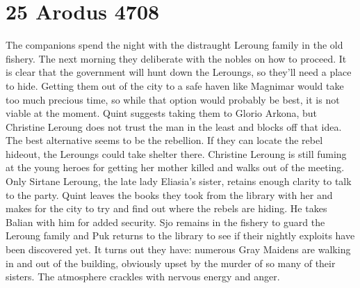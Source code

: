 \section{25 Arodus 4708}

The companions spend the night with the distraught Leroung family in the old fishery. The next morning they deliberate with the nobles on how to proceed. It is clear that the government will hunt down the Leroungs, so they'll need a place to hide. Getting them out of the city to a safe haven like Magnimar would take too much precious time, so while that option would probably be best, it is not viable at the moment. Quint suggests taking them to Glorio Arkona, but Christine Leroung does not trust the man in the least and blocks off that idea. The best alternative seems to be the rebellion. If they can locate the rebel hideout, the Leroungs could take shelter there. Christine Leroung is still fuming at the young heroes for getting her mother killed and walks out of the meeting. Only Sirtane Leroung, the late lady Eliasia's sister, retains enough clarity to talk to the party. Quint leaves the books they took from the library with her and makes for the city to try and find out where the rebels are hiding. He takes Balian with him for added security. Sjo remains in the fishery to guard the Leroung family and Puk returns to the library to see if their nightly exploits have been discovered yet. It turns out they have: numerous Gray Maidens are walking in and out of the building, obviously upset by the murder of so many of their sisters. The atmosphere crackles with nervous energy and anger.\\

